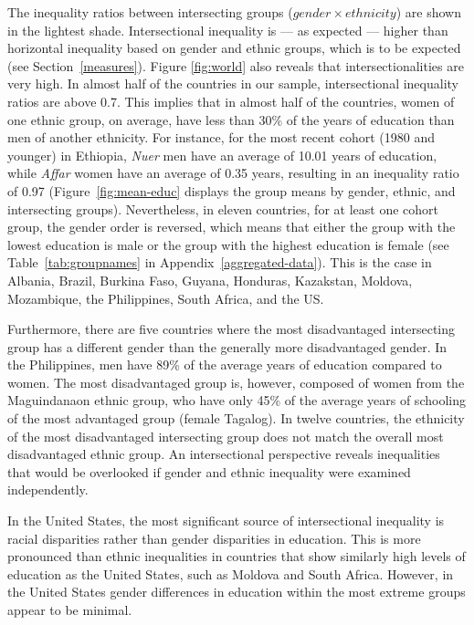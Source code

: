 The inequality ratios between intersecting groups ($gender \times ethnicity$) are shown in the lightest shade. Intersectional inequality is --- as expected --- higher than horizontal inequality based on gender and ethnic groups, which is to be expected (see Section~\ref{measures}). Figure \ref{fig:world} also reveals that intersectionalities are very high. In almost half of the countries in our sample, intersectional inequality ratios are above 0.7. This implies that in almost half of the countries, women of one ethnic group, on average, have less than 30\% of the years of education than men of another ethnicity. For instance, for the most recent cohort (1980 and younger) in Ethiopia, \textit{Nuer} men have an average of 10.01 years of education, while \textit{Affar} women have an average of 0.35 years, resulting in an inequality ratio of 0.97 (Figure~\ref{fig:mean-educ} displays the group means by gender, ethnic, and intersecting groups). Nevertheless, in eleven countries, for at least one cohort group, the gender order is reversed, which means that either the group with the lowest education is male or the group with the highest education is female (see Table~\ref{tab:groupnames} in Appendix~\ref{aggregated-data}). This is the case in Albania, Brazil, Burkina Faso, Guyana, Honduras, Kazakstan, Moldova, Mozambique, the Philippines, South Africa, and the US.

Furthermore, there are five countries where the most disadvantaged intersecting group has a different gender than the generally more disadvantaged gender. In the Philippines, men have 89\% of the average years of education compared to women. The most disadvantaged group is, however, composed of women from the Maguindanaon ethnic group, who have only 45\% of the average years of schooling of the most advantaged group (female Tagalog). In twelve countries, the ethnicity of the most disadvantaged intersecting group does not match the overall most disadvantaged ethnic group. An intersectional perspective reveals inequalities that would be overlooked if gender and ethnic inequality were examined independently.

In the United States, the most significant source of intersectional inequality is racial disparities rather than gender disparities in education. This is more pronounced than ethnic inequalities in countries that show similarly high levels of education as the United States, such as Moldova and South Africa. However, in the United States gender differences in education within the most extreme groups appear to be minimal.

